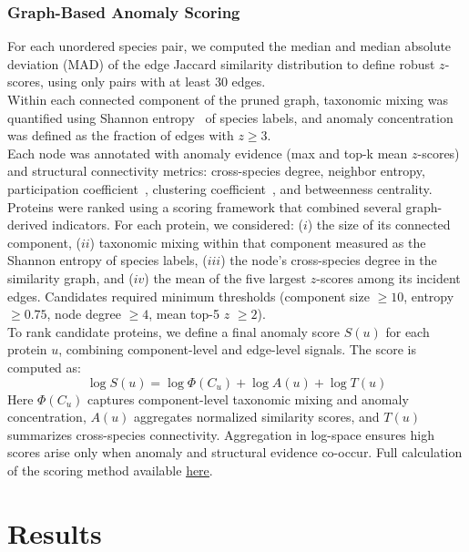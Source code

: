\documentclass[11pt]{article}
\begin{document}
	\subsubsection{Graph-Based Anomaly Scoring}
	For each unordered species pair, we computed the median and median absolute deviation (MAD) of the edge Jaccard similarity distribution to define robust $z$-scores, using only pairs with at least 30 edges.\\
	Within each connected component of the pruned graph, taxonomic mixing was quantified using Shannon entropy~\cite{ShannonEntropy} of species labels, and anomaly concentration was defined as the fraction of edges with $z\ge3$.\\
	Each node was annotated with anomaly evidence (max and top-k mean $z$-scores) and structural connectivity metrics: cross-species degree, neighbor entropy, participation coefficient~\cite{Guimera2005}, clustering coefficient~\cite{Watts1998}, and betweenness centrality.\\
	Proteins were ranked using a scoring framework that combined several graph-derived indicators. For each protein, we considered: ($i$) the size of its connected component, ($ii$) taxonomic mixing within that component measured as the Shannon entropy of species labels, ($iii$) the node’s cross-species degree in the similarity graph, and ($iv$) the mean of the five largest $z$-scores among its incident edges. Candidates required minimum thresholds (component size $\geq 10$, entropy $\geq 0.75$, node degree $\geq 4$, mean top-5 $z$ $\geq 2$).\\
	To rank candidate proteins, we define a final anomaly score $S(u)$ for each protein $u$, combining component-level and edge-level signals. The score is computed as:
	\begin{equation*}
	\log S(u) = \log \Phi(C_u) + \log A(u) + \log T(u)
	\end{equation*}
	\noindent
	Here $\Phi(C_u)$ captures component-level taxonomic mixing and anomaly concentration, $A(u)$ aggregates normalized similarity scores, and $T(u)$ summarizes cross-species connectivity. Aggregation in log-space ensures high scores arise only when anomaly and structural evidence co-occur. Full calculation of the scoring method available \href{https://github.com/noam-kimhi/Who-Stole-My-Genes/blob/main/Method\%202/LaTeX/scoring_appendix.pdf}{\uline{here}}.
	
	\FloatBarrier
	
	\section{Results}
\end{document}
